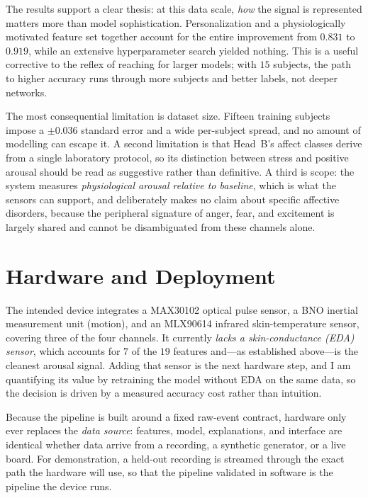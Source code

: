 \documentclass[11pt,a4paper]{article}
\begin{document}
The results support a clear thesis: at this data scale, \emph{how} the signal is represented matters
more than model sophistication. Personalization and a physiologically motivated feature set together
account for the entire improvement from $0.831$ to $0.919$, while an extensive hyperparameter search
yielded nothing. This is a useful corrective to the reflex of reaching for larger models; with $15$
subjects, the path to higher accuracy runs through more subjects and better labels, not deeper
networks.

The most consequential limitation is dataset size. Fifteen training subjects impose a $\pm 0.036$
standard error and a wide per-subject spread, and no amount of modelling can escape it. A second
limitation is that Head~B's affect classes derive from a single laboratory protocol, so its
distinction between stress and positive arousal should be read as suggestive rather than definitive.
A third is scope: the system measures \emph{physiological arousal relative to baseline}, which is
what the sensors can support, and deliberately makes no claim about specific affective disorders,
because the peripheral signature of anger, fear, and excitement is largely shared and cannot be
disambiguated from these channels alone.

\section{Hardware and Deployment}

The intended device integrates a MAX30102 optical pulse sensor, a BNO inertial measurement unit
(motion), and an MLX90614 infrared skin-temperature sensor, covering three of the four channels. It
currently \emph{lacks a skin-conductance (EDA) sensor}, which accounts for $7$ of the $19$ features
and---as established above---is the cleanest arousal signal. Adding that sensor is the next hardware
step, and I am quantifying its value by retraining the model without EDA on the same data, so the
decision is driven by a measured accuracy cost rather than intuition.

Because the pipeline is built around a fixed raw-event contract, hardware only ever replaces the
\emph{data source}: features, model, explanations, and interface are identical whether data arrive
from a recording, a synthetic generator, or a live board. For demonstration, a held-out recording is
streamed through the exact path the hardware will use, so that the pipeline validated in software is
the pipeline the device runs.
\end{document}
